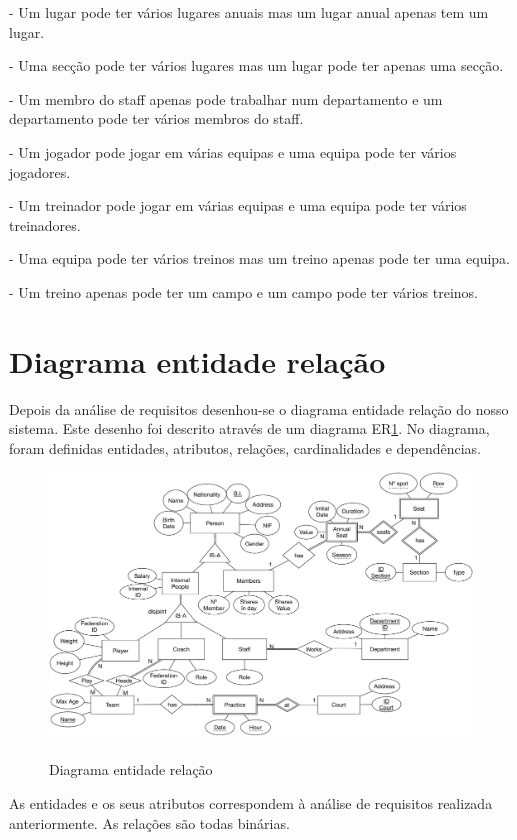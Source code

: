 \documentclass[pdftex,12pt,a4paper]{report}
\begin{document}
- Um lugar pode ter vários lugares anuais mas um lugar anual apenas tem um lugar.

- Uma secção pode ter vários lugares mas um lugar pode ter apenas uma secção.

- Um membro do staff apenas pode trabalhar num departamento e um departamento pode ter vários membros do staff.

- Um jogador pode jogar em várias equipas e uma equipa pode ter vários jogadores.

- Um treinador pode jogar em várias equipas e uma equipa pode ter vários treinadores.

- Uma equipa pode ter vários treinos mas um treino apenas pode ter uma equipa.

- Um treino apenas pode ter um campo e um campo pode ter vários treinos.

\newpage
\section{Diagrama entidade relação}
Depois da análise de requisitos desenhou-se o diagrama entidade relação do nosso sistema. Este desenho foi descrito através de um diagrama ER\ref{fig:eer}. No diagrama, foram definidas entidades, atributos, relações, cardinalidades e dependências.

\begin{figure}[!htb]
 \includegraphics[width=135mm,scale=1]{EER.pdf}
 \caption{\\Diagrama entidade relação}\label{fig:eer}
\end{figure}

As entidades e os seus atributos correspondem à análise de requisitos realizada anteriormente. As relações são todas binárias.
\end{document}
